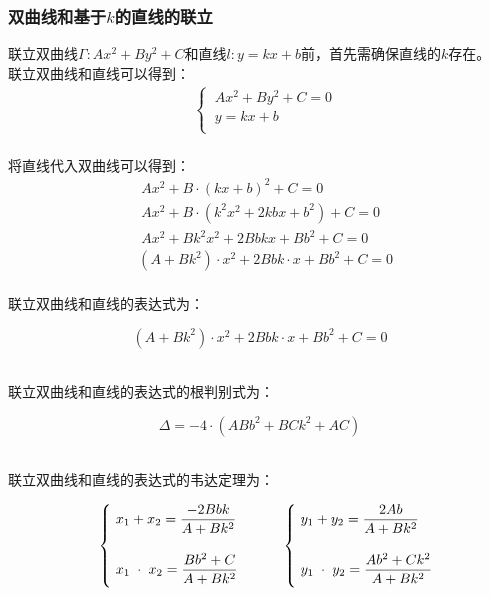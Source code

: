 \documentclass[UTF8]{ctexart}
\begin{document}
\subsubsection{双曲线和基于$k$的直线的联立}
    \setcounter{equation}{0}
    联立双曲线$\Gamma:Ax^2+By^2+C$和直线$l:y=kx+b$前，首先需确保直线的$k$存在。\\[3mm]
    联立双曲线和直线可以得到：
    \begin{align}
        &\begin{cases}
            ~Ax^2+By^2+C=0\\[1mm]
            ~y=kx+b\\[1mm]
        \end{cases}
    \end{align}\\[1mm]
    将直线代入双曲线可以得到：
    \begin{align}
        &~Ax^2+B\cdot(kx+b)^2+C=0\\[5mm]
        &~Ax^2+B\cdot\left(k^2x^2+2kbx+b^2\right)+C=0\\[5mm]
        &~Ax^2+Bk^2x^2+2Bbkx+Bb^2+C=0\\[5mm]
        &\left(A+Bk^2\right)\cdot x^2+2Bbk\cdot x+Bb^2+C=0
    \end{align}\\
    联立双曲线和直线的表达式为：
    \begin{large}
        \begin{equation*}
            \left(A+Bk^2\right)\cdot x^2+2Bbk\cdot x+Bb^2+C=0
        \end{equation*}
    \end{large}\\
    联立双曲线和直线的表达式的根判别式为：
    \begin{large}
        \begin{equation*}
            \Delta=-4\cdot\left(ABb^2+BCk^2+AC\right)
        \end{equation*}
    \end{large}\\
    联立双曲线和直线的表达式的韦达定理为：\vspace{8pt}
    \begin{large}
        \begin{equation*}
            ~~~~~~\begin{cases}
                ~x_1+x_2=\dfrac{-2Bbk}{A+Bk^2}\\[6mm]
                ~x_1\hspace{3.0pt}\cdot\hspace{3.0pt}x_2=\dfrac{Bb^2+C}{A+Bk^2}\\[2mm]
            \end{cases}~~~~~~
            \begin{cases}
                ~y_1+y_2=\dfrac{2Ab}{A+Bk^2}\\[6mm]
                ~y_1\hspace{3.0pt}\cdot\hspace{3.0pt}y_2=\dfrac{Ab^2+Ck^2}{A+Bk^2}\\[2mm]
            \end{cases}
        \end{equation*}
    \end{large}\\[3mm]
\end{document}
